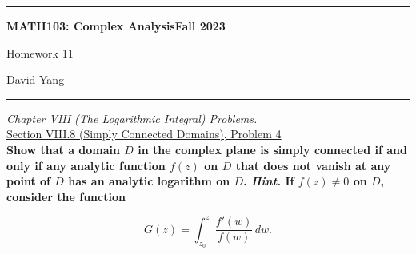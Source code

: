 \documentclass[11pt]{article}
\theoremstyle{definition}
\begin{document}
	\hrule
	\begin{center}
        \textbf{MATH103: Complex Analysis}\hfill \textbf{Fall 2023}\newline


		{\Large Homework 11}

		David Yang
	\end{center}

\hrule

\vspace{1em}


\textit{Chapter VIII (The Logarithmic Integral) Problems.} \\

\underline{Section VIII.8 (Simply Connected Domains), Problem 4}\\

\textbf{Show that a domain $D$ in the complex plane is simply connected if and only if any analytic function $f(z)$ on $D$ that does not vanish at any point of $D$ has an analytic logarithm on $D$. \textit{Hint.} If $f(z) \neq 0$ on $D$, consider the function}

\[ G(z) = \int_{z_0}^z \frac{f'(w)}{f(w)} \, dw. \]
\end{document}
